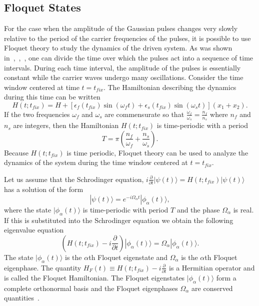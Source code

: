 \documentclass{article}
\begin{document}
\subsection{Floquet States}
%
For the case when the amplitude of the Gaussian pulses changes very slowly relative to the period of the carrier frequencies of the pulses, it is possible to use Floquet theory to study the dynamics of the driven system. As was shown in~\cite{na-reichl:pbox},~\cite{na-reichl:mol-rot},~\cite{na-reichl:isomer}, one can divide the time over which the pulses act into a sequence of time intervals.  During each time interval, the amplitude of the pulses is essentially constant while the carrier waves undergo many oscillations.  Consider the time window centered at time $t=t_{fix}$.  The Hamiltonian describing the dynamics during this time can be written 
%
\begin{equation}
H(t;t_{fix})=H+\left[\epsilon_f(t_{fix})\sin(\omega_ft)+\epsilon_s(t_{fix})\sin(\omega_st)\right](x_1+x_2).
\end{equation}
%
If the two frequencies ${\omega}_f$ and ${\omega}_s$  are commensurate so that $\frac{\omega_f}{\omega_s}=\frac{n_f}{n_s}$ where $n_f$ and $n_s$ are integers, then the Hamiltonian $H(t;t_{fix})$  is time-periodic with a period 
%
\begin{equation}
T=\pi(\frac{n_f}{\omega_f}+\frac{n_s}{\omega_s}).
\label{eq:effperiod}
\end{equation}
%
Because $H(t;t_{fix})$ is time periodic, Floquet theory can be used to  analyze the dynamics of the system during the time window centered at $t=t_{fix}$.

Let us assume that the Schrodinger equation, $i\frac{{\partial}}{{\partial}t}|\psi(t){\rangle}=H(t;t_{fix})|\psi(t){\rangle}$ has a solution of the form
%
\begin{equation}
|\psi(t)\rangle = e^{-i\Omega_{\alpha}t}|\phi_{\alpha}(t)\rangle ,
\end{equation}
%
where the state $|\phi_{\alpha}(t)\rangle$ is time-periodic with period $T$ and the phase $\Omega_{\alpha}$ is real.  If this is substituted into the Schrodinger equation we obtain the following eigenvalue equation
%
\begin{equation}
(H(t;t_{fix})-i\frac{\partial}{\partial t})|\phi_{\alpha}(t)\rangle = \Omega_{\alpha}|\phi_{\alpha}(t)\rangle.
\end{equation}
%
The state $|\phi_{\alpha}(t)\rangle$ is the $\alpha$th Floquet eigenstate and $\Omega_{\alpha}$ is the $\alpha$th Floquet eigenphase.  The quantity $H_F(t){\equiv}H(t;t_{fix})-i\frac{\partial}{\partial t}$ is a Hermitian operator and is called the Floquet Hamiltonian. The Floquet eigenstates $|\phi_{\alpha}(t)\rangle$  form a complete orthonormal basis and the Floquet eigenphases $\Omega_{\alpha}$ are conserved quantities~\cite{reichl}.
\end{document}
